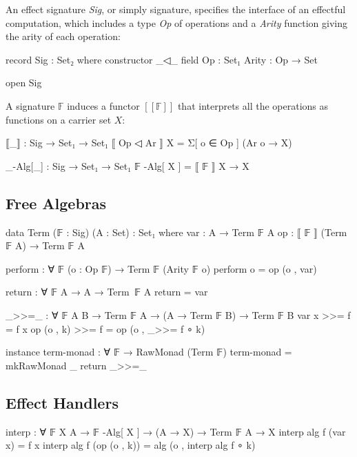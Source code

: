 An effect signature \textit{Sig}, or simply signature, specifies the interface of an effectful computation, which includes a type \textit{Op} of operations and a \textit{Arity} function giving the arity of each operation:
%
\begin{center}\begin{code}
record Sig : Set₂ where
  constructor _◁_
  field
    Op : Set₁
    Arity : Op → Set
\end{code}\end{center}
%
\begin{code}[hide]
open Sig
\end{code}

A signature $\mathbb{F}$ induces a functor $[\![ \mathbb{F} ]\!]$ that interprets all the operations as functions on a carrier set $X$:
%
\begin{center}\begin{code}
⟦_⟧ : Sig → Set₁ → Set₁
⟦ Op ◁ Ar ⟧ X = Σ[ o ∈ Op ] (Ar o → X)

_-Alg[_] : Sig → Set₁ → Set₁
𝔽 -Alg[ X ] = ⟦ 𝔽 ⟧ X → X
\end{code}\end{center}

\subsection{Free Algebras}

\begin{center}\begin{code}
data Term (𝔽 : Sig) (A : Set) : Set₁ where
  var : A → Term 𝔽 A
  op : ⟦ 𝔽 ⟧ (Term 𝔽 A) → Term 𝔽 A

perform : ∀ {𝔽} (o : Op 𝔽) → Term 𝔽 (Arity 𝔽 o)
perform o = op (o , var)

return : ∀ {𝔽} {A} → A → Term 𝔽 A
return = var

_>>=_ : ∀ {𝔽} {A B} → Term 𝔽 A → (A → Term 𝔽 B) → Term 𝔽 B
var x      >>= f = f x
op (o , k) >>= f = op (o , _>>= f ∘ k)
\end{code}\end{center}

\begin{code}[hide]
instance
  term-monad : ∀ {𝔽} → RawMonad (Term 𝔽)
  term-monad = mkRawMonad _ return _>>=_ 
\end{code}

\subsection{Effect Handlers}

\begin{center}\begin{code}
interp : ∀ {𝔽} {X A} → 𝔽 -Alg[ X ] → (A → X) → Term 𝔽 A → X
interp alg f (var x)      = f x
interp alg f (op (o , k)) = alg (o , interp alg f ∘ k)
\end{code}\end{center}

